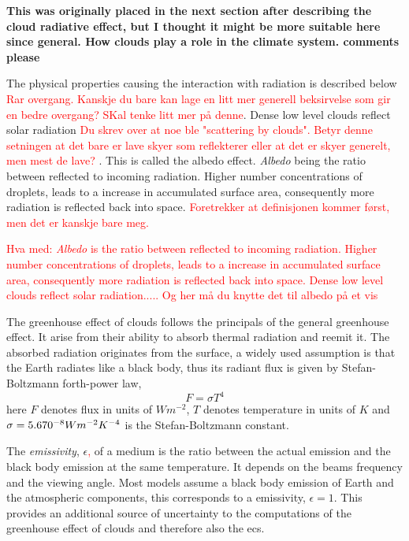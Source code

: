 \textbf{This was originally placed in the next section after describing the cloud radiative effect, but I thought it might be more suitable here since general. How clouds play a role in the climate system. comments please}

The physical properties causing the interaction with radiation is described below \textcolor{red}{Rar overgang. Kanskje du bare kan lage en litt mer generell beksirvelse som gir en bedre overgang? SKal tenke litt mer på denne}. Dense low level clouds reflect solar radiation \textcolor{red}{Du skrev over at noe ble "scattering by clouds". Betyr denne setningen at det bare er lave skyer som reflekterer eller at det er skyer generelt, men mest de lave? }. This is called the albedo effect. \textit{Albedo} being the ratio between reflected to incoming radiation. Higher number concentrations of droplets, leads to a increase in accumulated surface area, consequently more radiation is reflected back into space. \textcolor{red}{Foretrekker at definisjonen kommer først, men det er kanskje bare meg. }

\textcolor{red}{Hva med: \textit{Albedo} is the ratio between reflected to incoming radiation. Higher number concentrations of droplets, leads to a increase in accumulated surface area, consequently more radiation is reflected back into space. Dense low level clouds reflect solar radiation..... Og her må du knytte det til albedo på et vis}

The greenhouse effect of clouds follows the principals of the general greenhouse effect. It arise from their ability to absorb thermal radiation and reemit it. The absorbed radiation originates from the surface, a widely used assumption is that the Earth radiates like a black body, thus its radiant flux is given by Stefan-Boltzmann forth-power law, 
\begin{equation} \label{eq:stefan-boltzmann}
    F = \sigma  T ^4 %
\end{equation}
here $F$ denotes flux in units of $W m^{-2}$, $T$ denotes temperature in units of $K$ and \\  $\sigma = 5.670 \time 10^{-8} W m^{-2} K^{-4}$ is the Stefan-Boltzmann constant. 

The \textit{emissivity}, $\epsilon$\textcolor{red}{,} of a medium is the ratio between the actual emission and the black body emission at the same temperature. It depends on the beams frequency and the viewing angle. Most models assume a black body emission of Earth and the atmospheric components, this corresponds to a emissivity, $\epsilon=1$. This provides an additional source of uncertainty to the computations of the greenhouse effect of clouds and therefore also the \acrshort{ecs}.

